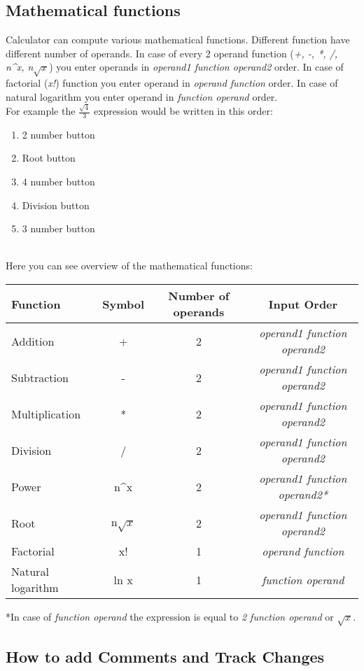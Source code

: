 \documentclass{article}
\begin{document}
\subsection{Mathematical functions}
\label{mf}
Calculator can compute various mathematical functions. Different function have different number of operands. In case of every 2 operand function (\emph{+, -, *, /, n\^{}x, n$\sqrt{x}$}) you enter operands in \emph{operand1 function operand2} order. In case of factorial (\emph{x!}) function you enter operand in \emph{operand function} order. In case of natural logarithm you enter operand in \emph{function operand} order.
\\For example the $\frac{\sqrt{4}}{3}$ expression would be written in this order:
\begin{enumerate}
\item 2 number button
\item Root button
\item 4 number button
\item Division button
\item 3 number button
\end{enumerate}
\\
Here you can see overview of the mathematical functions:
\begin{center}
\begin{tabular}{| l | c | c | c |}
\hline
Function & Symbol & Number of operands & Input Order\\\hline\hline
Addition & + & 2 & \emph{operand1 function operand2}\\\hline
Subtraction & - & 2 & \emph{operand1 function operand2}\\\hline
Multiplication & * & 2 & \emph{operand1 function operand2}\\\hline
Division & / & 2 & \emph{operand1 function operand2}\\\hline
Power & n\^{}x & 2 & \emph{operand1 function operand2*}\\\hline
Root & n$\sqrt{x}$  & 2 & \emph{operand1 function operand2}\\\hline
Factorial & x! & 1 & \emph{operand function}\\\hline
Natural logarithm & ln x & 1 & \emph{function operand}\\\hline
\end{tabular}
\end{center}
*In case of \emph{function operand} the expression is equal to \emph{2 function operand} or $\sqrt{x}$.
\subsection{How to add Comments and Track Changes}
\end{document}
